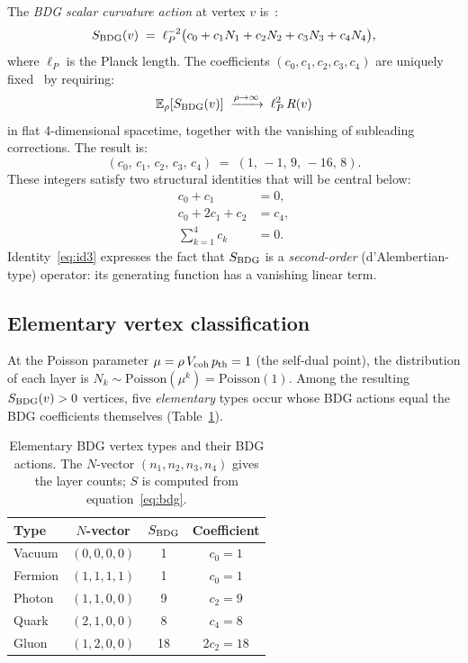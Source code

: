 \documentclass[12pt,a4paper]{article}
\theoremstyle{definition}
\begin{document}
The \emph{BDG scalar curvature action} at vertex $v$ is~\cite{Benincasa2010}:
\begin{equation}
  \label{eq:bdg}
  S_{\rm BDG}(v) \;=\; \ell_P^{-2}
  \bigl(c_0 + c_1 N_1 + c_2 N_2 + c_3 N_3 + c_4 N_4\bigr),
\end{equation}
where $\ell_P$ is the Planck length.  The coefficients
$(c_0,c_1,c_2,c_3,c_4)$ are uniquely fixed~\cite{Benincasa2010,Dowker2013}
by requiring:
\begin{equation}
  \label{eq:continuum}
  \mathbb{E}_\rho[S_{\rm BDG}(v)] \;\xrightarrow{\rho\to\infty}\; \ell_P^2\, R(v)
\end{equation}
in flat 4-dimensional spacetime, together with the vanishing of subleading
corrections.  The result is:
\begin{equation}
  \label{eq:coeffs}
  (c_0,\,c_1,\,c_2,\,c_3,\,c_4) \;=\; (1,\,-1,\,9,\,-16,\,8).
\end{equation}
These integers satisfy two structural identities that will be central below:
\begin{align}
  c_0 + c_1 &= 0,  \label{eq:id1} \\
  c_0 + 2c_1 + c_2 &= c_4,  \label{eq:id2} \\
  \sum_{k=1}^{4} c_k &= 0.  \label{eq:id3}
\end{align}
Identity~\eqref{eq:id3} expresses the fact that $S_{\rm BDG}$ is a
\emph{second-order} (d'Alembertian-type) operator: its generating function
has a vanishing linear term.

\subsection{Elementary vertex classification}

At the Poisson parameter $\mu = \rho\, V_{\rm coh}\, p_{\rm th} = 1$
(the self-dual point), the distribution of each layer is
$N_k \sim \mathrm{Poisson}(\mu^k) = \mathrm{Poisson}(1)$.  Among the
resulting $S_{\rm BDG}(v) > 0$ vertices, five \emph{elementary} types
occur whose BDG actions equal the BDG coefficients themselves (Table~\ref{tab:types}).

\begin{table}[h]
\centering
\caption{Elementary BDG vertex types and their BDG actions.  The
$N$-vector $(n_1,n_2,n_3,n_4)$ gives the layer counts; $S$ is
computed from equation~\eqref{eq:bdg}.}
\label{tab:types}
\begin{tabular}{lccc}
\toprule
Type & $N$-vector & $S_{\rm BDG}$ & Coefficient \\
\midrule
Vacuum  & $(0,0,0,0)$ & 1  & $c_0 = 1$ \\
Fermion & $(1,1,1,1)$ & 1  & $c_0 = 1$ \\
Photon  & $(1,1,0,0)$ & 9  & $c_2 = 9$ \\
Quark   & $(2,1,0,0)$ & 8  & $c_4 = 8$ \\
Gluon   & $(1,2,0,0)$ & 18 & $2c_2 = 18$ \\
\bottomrule
\end{tabular}
\end{table}
\end{document}
